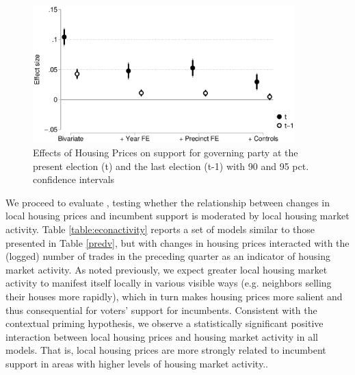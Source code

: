 \documentclass[12pt,a4paper]{article}
\begin{document}
	\begin{figure}[htbp!]
		\includegraphics[width=0.9\textwidth]{../figures/lagdv.eps}
		\centering
		\caption{Effects of Housing Prices on support for governing party at the present election (t) and the last election (t-1) with 90  and 95 pct. confidence intervals}\label{placebo}
	\end{figure}
	
	We proceed to evaluate \htwo, testing whether the relationship between changes in local housing prices and incumbent support is moderated by local housing market activity. Table \ref{table:econactivity} reports a set of models similar to those presented in Table \ref{predv}, but with changes in housing prices interacted with the (logged) number of trades in the preceding quarter as an indicator of housing market activity. As noted previously, we expect greater local housing market activity to manifest itself locally in various visible ways (e.g. neighbors selling their houses more rapidly), which in turn makes housing prices more salient and thus consequential for voters’ support for incumbents. Consistent with the contextual priming hypothesis, we observe a statistically significant positive interaction between local housing prices and housing market activity in all models. That is, local housing prices are more strongly related to incumbent support in areas with higher levels of housing market activity..
	
	
	
\end{document}

